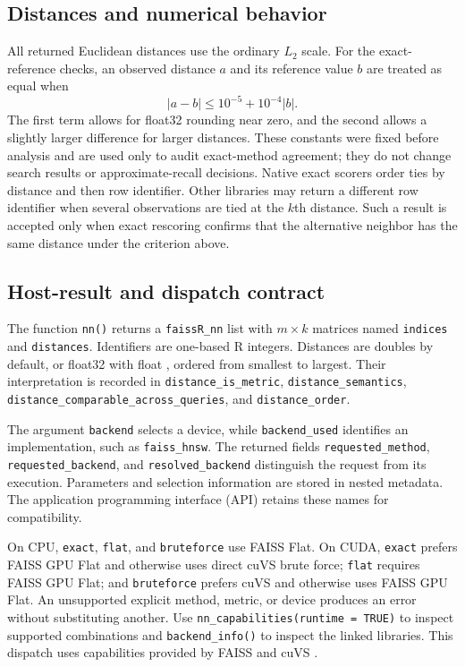 \documentclass[11pt]{article}
\newcommand{\code}[1]{\texttt{#1}}
\newcommand{\pkg}[1]{\textsf{#1}}
\newcommand{\class}[1]{\texttt{#1}}
\begin{document}
\subsection{Distances and numerical behavior} \label{sec:supp-numerics}

All returned Euclidean distances use the ordinary $L_2$ scale. For the
exact-reference checks, an observed distance $a$ and its reference value $b$
are treated as equal when
\[
|a-b|\leq 10^{-5}+10^{-4}|b|.
\]
The first term allows for float32 rounding near zero, and the second allows a
slightly larger difference for larger distances. These constants were fixed
before analysis and are used only to audit exact-method agreement; they do not
change search results or approximate-recall decisions. Native exact scorers
order ties by distance and then row identifier. Other libraries may return a
different row identifier when several observations are tied at the $k$th
distance. Such a result is accepted only when exact rescoring confirms that the
alternative neighbor has the same distance under the criterion above.

\subsection{Host-result and dispatch contract}

The function \code{nn()} returns a \class{faissR\_nn} list with
$m\times k$ matrices named \code{indices} and \code{distances}. Identifiers
are one-based R integers. Distances are doubles by default, or float32 with
\pkg{float} \citep{float}, ordered from smallest to largest. Their interpretation is
recorded in \code{distance\_is\_metric}, \code{distance\_semantics},
\code{distance\_comparable\_across\_queries}, and \code{distance\_order}.

The argument \code{backend} selects a device, while
\code{backend\_used} identifies an implementation, such as
\code{faiss\_hnsw}. The returned fields \code{requested\_method},
\code{requested\_backend}, and \code{resolved\_backend} distinguish the request
from its execution. Parameters and selection information are stored in nested
metadata. The application programming interface (API) retains these names
for compatibility.

On CPU, \code{exact}, \code{flat}, and \code{bruteforce} use FAISS Flat.
On CUDA, \code{exact} prefers FAISS GPU Flat and otherwise uses direct cuVS
brute force; \code{flat} requires FAISS GPU Flat; and \code{bruteforce}
prefers cuVS and otherwise uses FAISS GPU Flat. An unsupported explicit
method, metric, or device produces an error without substituting another.
Use \code{nn\_capabilities(runtime = TRUE)} to inspect supported combinations
and \code{backend\_info()} to inspect the linked libraries. This dispatch
uses capabilities provided by FAISS and cuVS
\citep{JohnsonDouzeJegou2021,DouzeEtAl2024,cuVS,FaissCuVS}.
\end{document}

